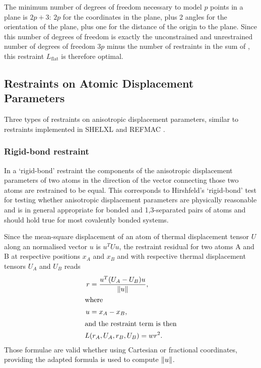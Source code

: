 \documentclass[pdf]{iucr}
\begin{document}
The minimum number of degrees of freedom necessary to model $p$ points in a plane is $2p+3$: $2p$ for the coordinates in the plane, plus 2 angles for the orientation of the plane, plus one for the distance of the origin to the plane. Since this number of degrees of freedom is exactly the unconstrained and unrestrained number of degrees of freedom $3p$ minus the number of restraints in the sum of , this restraint $L_\text{flat}$ is therefore optimal.

\subsection{Restraints on Atomic Displacement Parameters}

Three types of restraints on anisotropic displacement parameters, similar to restraints implemented in SHELXL \cite{Sheldrick:2008aa} and REFMAC \cite{Murshudov:1999aa}.

\subsubsection{Rigid-bond restraint}

In a `rigid-bond' restraint the components of the anisotropic displacement parameters of two atoms in the direction of the vector connecting those two atoms are restrained to be equal. This corresponds to Hirshfeld's `rigid-bond' test \cite{Hirshfeld:1976aa} for testing whether anisotropic displacement parameters are physically reasonable \cite{Sheldrick:1997aa} and is in general appropriate for bonded and 1,3-separated pairs of atoms and should hold true for most covalently bonded systems.

Since the mean-square displacement of an atom of thermal displacement tensor $U$ along an normalised vector $u$ is $u^T U u$, the restraint residual for two atoms A and B at respective positions $x_A$ and $x_B$ and with respective thermal displacement tensors $U_A$ and $U_B$ reads
\begin{align}
\label{eqn:rigid_bond}
r &= \frac{u^T (U_A - U_B) u}{\left\| u \right\|},\\
\shortintertext{where}
u &= x_A - x_B, \\
\shortintertext{and the restraint term is then}
L&(r_A, U_A, r_B, U_B) = w r^2.
\end{align}
Those formulae are valid whether using Cartesian or fractional coordinates, providing the adapted formula is used to compute $\left\| u \right\|$.
\end{document}
